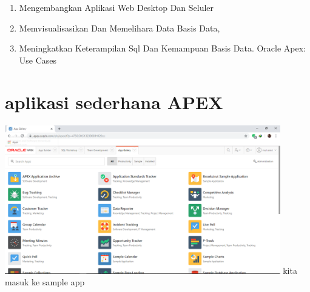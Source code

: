 \documentclass[12pt, times news roman, a4paper] {article}
\begin{document}
\begin {enumerate}
\section{Apa Itu Oracle Apex?}
\item  Mengembangkan Aplikasi Web Desktop Dan Seluler
\item  Memvisualisasikan Dan Memelihara Data Basis Data,
\item  Meningkatkan Keterampilan Sql Dan Kemampuan Basis Data.
Oracle Apex: Use Cases
\end{enumerate}

\section {aplikasi sederhana APEX}
\begin{minipage}{\linewidth}
	\centering
	\includegraphics[width=12cm]{Gambar.png} 
	 {kita masuk ke sample app}
\end{minipage}
\end{document}
